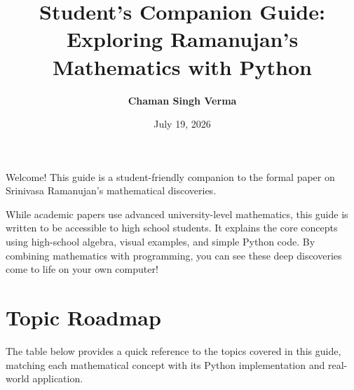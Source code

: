 \documentclass[11pt]{article}
\title{\textbf{Student's Companion Guide: \\ Exploring Ramanujan's Mathematics with Python}}
\author{\textbf{Chaman Singh Verma}}
\date{July 19, 2026}
\begin{document}
\maketitle

Welcome! This guide is a student-friendly companion to the formal paper on Srinivasa Ramanujan's mathematical discoveries. 

While academic papers use advanced university-level mathematics, this guide is written to be accessible to high school students. It explains the core concepts using high-school algebra, visual examples, and simple Python code. By combining mathematics with programming, you can see these deep discoveries come to life on your own computer!

\section{Topic Roadmap}
The table below provides a quick reference to the topics covered in this guide, matching each mathematical concept with its Python implementation and real-world application.

\begin{table}[h!]
\centering
\small
{}
\caption{Roadmap of Ramanujan's concepts explored in this guide.}
\label{tab:roadmap}
\end{table}
\end{document}
